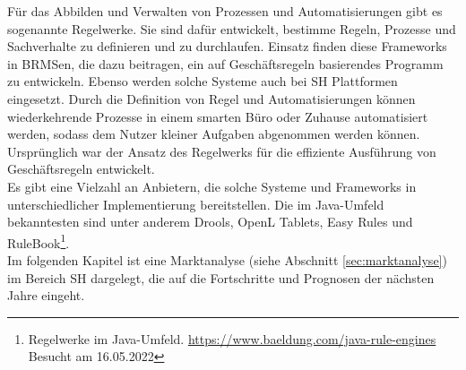         \linebreak
        Für das Abbilden und Verwalten von Prozessen und Automatisierungen gibt es sogenannte Regelwerke. 
        Sie sind dafür entwickelt, bestimme Regeln, Prozesse und Sachverhalte zu definieren und zu durchlaufen. 
        Einsatz finden diese Frameworks in \ac{BRMS}en, die dazu beitragen, ein auf Geschäftsregeln basierendes Programm zu entwickeln. 
        Ebenso werden solche Systeme auch bei \acl{SH} Plattformen eingesetzt. Durch die Definition von Regel und Automatisierungen 
        können wiederkehrende Prozesse in einem smarten 
        Büro oder Zuhause automatisiert werden, sodass dem Nutzer kleiner Aufgaben abgenommen werden können. Ursprünglich war der 
        Ansatz des Regelwerks für die effiziente Ausführung von Geschäftsregeln entwickelt. 
        \\
        Es gibt eine Vielzahl an Anbietern, die solche Systeme und Frameworks 
        in unterschiedlicher Implementierung bereitstellen. Die im Java-Umfeld bekanntesten sind unter anderem Drools, OpenL Tablets, 
        Easy Rules und RuleBook\footnote{Regelwerke im Java-Umfeld. \url{https://www.baeldung.com/java-rule-engines} Besucht am 16.05.2022}.
        \\
        Im folgenden Kapitel ist eine Marktanalyse (siehe Abschnitt \ref{sec:marktanalyse}) im Bereich \acl{SH} dargelegt, die auf die Fortschritte 
        und Prognosen der nächsten Jahre eingeht.
